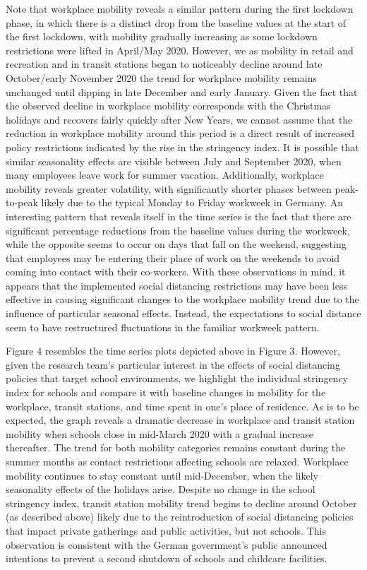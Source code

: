 Note that workplace mobility reveals a similar pattern during the first lockdown phase, in which there is a distinct drop from the baseline values at the start of the first lockdown, with mobility gradually increasing as some lockdown restrictions were lifted in April/May 2020. However, we as mobility in retail and recreation and in transit stations began to noticeably decline around late October/early November 2020 the trend for workplace mobility remains unchanged until dipping in late December and early January. Given the fact that the observed decline in workplace mobility corresponds with the Christmas holidays and recovers fairly quickly after New Years, we cannot assume that the reduction in workplace mobility around this period is a direct result of increased policy restrictions indicated by the rise in the stringency index. It is possible that similar seasonality effects are visible between July and September 2020, when many employees leave work for summer vacation. Additionally, workplace mobility reveals greater volatility, with significantly shorter phases between peak-to-peak likely due to the typical Monday to Friday workweek in Germany. An interesting pattern that reveals itself in the time series is the fact that there are significant percentage reductions from the baseline values during the workweek, while the opposite seems to occur on days that fall on the weekend, suggesting that employees may be entering their place of work on the weekends to avoid coming into contact with their co-workers. With these observations in mind, it appears that the implemented social distancing restrictions may have been less effective in causing significant changes to the workplace mobility trend due to the influence of particular seasonal effects. Instead, the expectations to social distance seem to have restructured fluctuations in the familiar workweek pattern. 

Figure 4 resembles the time series plots depicted above in Figure 3. However, given the research team’s particular interest in the effects of social distancing policies that target school environments, we highlight the individual stringency index for schools and compare it with baseline changes in mobility for the workplace, transit stations, and time spent in one’s place of residence. As is to be expected, the graph reveals a dramatic decrease in workplace and transit station mobility when schools close in mid-March 2020 with a gradual increase thereafter. The trend for both mobility categories remains constant during the summer months as contact restrictions affecting schools are relaxed. Workplace mobility continues to stay constant until mid-December, when the likely seasonality effects of the holidays arise. Despite no change in the school stringency index, transit station mobility trend begins to decline around October (as described above) likely due to the reintroduction of social distancing policies that impact private gatherings and public activities, but not schools. This observation is consistent with the German government’s public announced intentions to prevent a second shutdown of schools and childcare facilities.